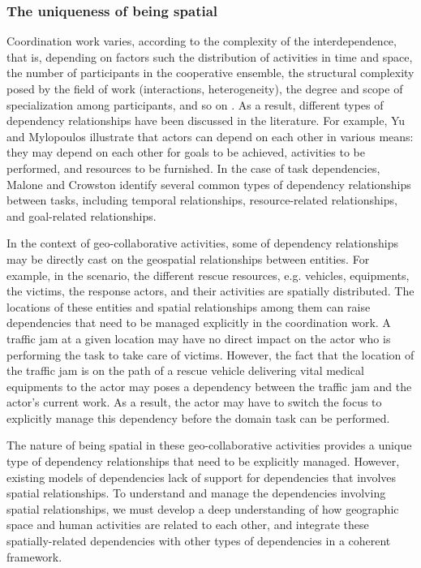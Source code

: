 \subsubsection{The uniqueness of being spatial} %
\label{ssub:the_uniqueness_of_being_spatial}
Coordination work varies, according to the complexity of the interdependence, that is, depending on factors such the distribution of activities in time and space, the number of participants in the cooperative ensemble, the structural complexity posed by the field of work (interactions, heterogeneity), the degree and scope of specialization among participants, and so on \cite{schmidt1996a}. As a result, different types of dependency relationships have been discussed in the literature. For example, Yu and Mylopoulos \cite{yu1993actor} illustrate that actors can depend on each other in various means: they may depend on each other for goals to be achieved, activities to be performed, and resources to be furnished. In the case of task dependencies, Malone and Crowston \cite{malone1994interdisciplinary} identify several common types of dependency relationships between tasks, including temporal relationships, resource-related relationships, and goal-related relationships. 

In the context of geo-collaborative activities, some of dependency relationships may be directly cast on the geospatial relationships between entities. For example, in the scenario, the different rescue resources, e.g. vehicles, equipments, the victims, the response actors, and their activities are spatially distributed. The locations of these entities and spatial relationships among them can raise dependencies that need to be managed explicitly in the coordination work. A traffic jam at a given location may have no direct impact on the actor who is performing the task to take care of victims. However, the fact that the location of the traffic jam is on the path of a rescue vehicle delivering vital medical equipments to the actor may poses a dependency between the traffic jam and the actor's current work. As a result, the actor may have to switch the focus to explicitly manage this dependency before the domain task can be performed.

The nature of being spatial in these geo-collaborative activities provides a unique type of dependency relationships that need to be explicitly managed. However, existing models of dependencies lack of support for dependencies that involves spatial relationships. To understand and manage the dependencies involving spatial relationships, we must develop a deep understanding of how geographic space and human activities are related to each other, and integrate these spatially-related dependencies with other types of dependencies in a coherent framework.


